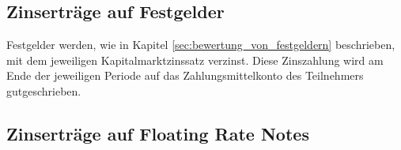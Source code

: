 \documentclass[12pt, a4paper]{article}
\theoremstyle{plain}
\newtheorem{example}{Beispiel}
\begin{document}
\subsection{Zinserträge auf Festgelder}
\label{sec:zinsertraege_auf_festgelder}
Festgelder werden, wie in Kapitel \ref{sec:bewertung_von_festgeldern} beschrieben, mit dem jeweiligen Kapitalmarktzinssatz verzinst. Diese Zinszahlung wird am Ende der jeweiligen Periode auf das Zahlungsmittelkonto des Teilnehmers gutgeschrieben.

\subsection{Zinserträge auf Floating Rate Notes}
\label{sec:zinsertraege_auf_floating_rate_notes}




\printbibliography[title={Literatur}]
\end{document}
